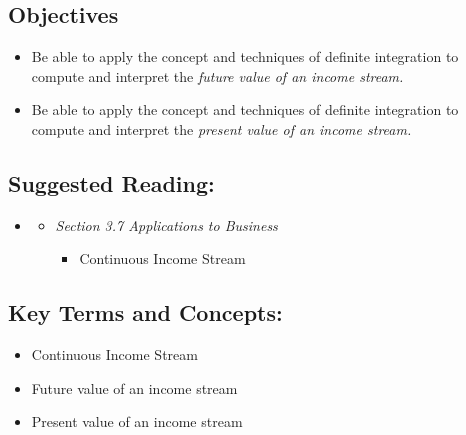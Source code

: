 \vspace{-0.25 in}
\begin{framed}
\subsection*{Objectives}
\begin{itemize}
    \item Be able to apply the concept and techniques of definite integration to compute and interpret the \emph{future value of an income stream.}
    \item Be able to apply the concept and techniques of definite integration to compute and interpret the \emph{present value of an income stream.}
    
\end{itemize}

\subsection*{Suggested Reading:}
\begin{itemize}
\item \cite{Calaway}\footnotemark[1]
    \begin{itemize}
        \item \emph{Section 3.7 Applications to Business}
        \begin{itemize}
            \item Continuous Income Stream
        \end{itemize}
    \end{itemize}
\end{itemize}
\subsection*{Key Terms and Concepts:} 

\begin{multicols}{2}
\begin{itemize}
    \item Continuous Income Stream
    \item Future value of an income stream
    \item Present value of an income stream
\end{itemize}
\end{multicols}
\end{framed}

